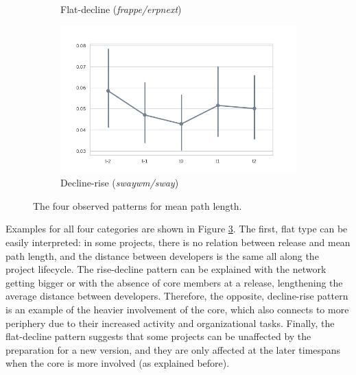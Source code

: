 \begin{figure}[!htbp]
\begin{subfigure}{0.49\textwidth}
        \caption{Flat-decline (\textit{frappe/erpnext})}
        \label{fig:mean-path-pattern3}
    \end{subfigure}
    \begin{subfigure}{0.49\textwidth}
        \centering
        \includegraphics[width=\textwidth]{figures/quantitative/pointplots/swaywm_sway.png}
        \caption{Decline-rise (\textit{swaywm/sway})}
        \label{fig:mean-path-pattern4}
    \end{subfigure}
    \caption{The four observed patterns for mean path length.}
    \label{fig:box-mean-path-patterns}
\end{figure}

Examples for all four categories are shown in Figure \ref{fig:box-mean-path-patterns}. The first, flat type can be easily interpreted: in some projects, there is no relation between release and mean path length, and the distance between developers is the same all along the project lifecycle. The rise-decline pattern can be explained with the network getting bigger or with the absence of core members at a release, lengthening the average distance between developers. Therefore, the opposite, decline-rise pattern is an example of the heavier involvement of the core, which also connects to more periphery due to their increased activity and organizational tasks. Finally, the flat-decline pattern suggests that some projects can be unaffected by the preparation for a new version, and they are only affected at the later timespans when the core is more involved (as explained before).

